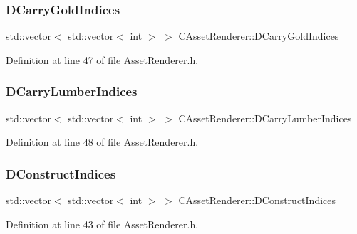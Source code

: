 \subsubsection{\texorpdfstring{D\+Carry\+Gold\+Indices}{DCarryGoldIndices}}
{\footnotesize\ttfamily std\+::vector$<$ std\+::vector$<$ int $>$ $>$ C\+Asset\+Renderer\+::\+D\+Carry\+Gold\+Indices\hspace{0.3cm}{\ttfamily [protected]}}



Definition at line 47 of file Asset\+Renderer.\+h.

\hypertarget{classCAssetRenderer_a986dc401334deb267cb772ff0650fcb6}{}\label{classCAssetRenderer_a986dc401334deb267cb772ff0650fcb6} 
\subsubsection{\texorpdfstring{D\+Carry\+Lumber\+Indices}{DCarryLumberIndices}}
{\footnotesize\ttfamily std\+::vector$<$ std\+::vector$<$ int $>$ $>$ C\+Asset\+Renderer\+::\+D\+Carry\+Lumber\+Indices\hspace{0.3cm}{\ttfamily [protected]}}



Definition at line 48 of file Asset\+Renderer.\+h.

\hypertarget{classCAssetRenderer_a1790a8f6992efbb3fea59dde42a3cacb}{}\label{classCAssetRenderer_a1790a8f6992efbb3fea59dde42a3cacb} 
\subsubsection{\texorpdfstring{D\+Construct\+Indices}{DConstructIndices}}
{\footnotesize\ttfamily std\+::vector$<$ std\+::vector$<$ int $>$ $>$ C\+Asset\+Renderer\+::\+D\+Construct\+Indices\hspace{0.3cm}{\ttfamily [protected]}}



Definition at line 43 of file Asset\+Renderer.\+h.

\hypertarget{classCAssetRenderer_a572091e74ab9acfa21d2c7c55a966886}{}\label{classCAssetRenderer_a572091e74ab9acfa21d2c7c55a966886} 
